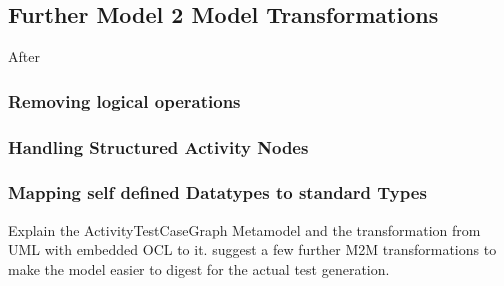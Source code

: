 

\subsection{Further Model 2 Model Transformations}
After 

\subsubsection{Removing logical operations}

\subsubsection{Handling Structured Activity Nodes}
\subsubsection{Mapping self defined Datatypes to standard Types}
Explain the ActivityTestCaseGraph Metamodel and the transformation from UML with embedded OCL to it. 
suggest a few further M2M transformations to make the model easier to digest for the actual test generation.
